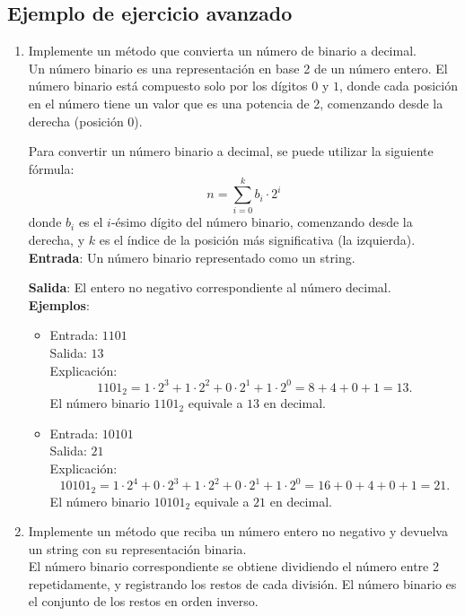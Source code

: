\documentclass{article}
\begin{document}
\subsection*{Ejemplo de ejercicio avanzado}

\begin{enumerate}[label=\alph*)]
    \item Implemente un método que convierta un número de binario a decimal.\\
    Un número binario es una representación en base 2 de un número entero. El número binario está compuesto solo por los dígitos \(0\) y \(1\), donde cada posición en el número tiene un valor que es una potencia de 2, comenzando desde la derecha (posición 0).

    Para convertir un número binario a decimal, se puede utilizar la siguiente fórmula:
    \[
    n = \sum_{i=0}^{k} b_i \cdot 2^i
    \]
    donde \(b_i\) es el \(i\)-ésimo dígito del número binario, comenzando desde la derecha, y \(k\) es el índice de la posición más significativa (la izquierda).\\

    \textbf{Entrada}: Un número binario representado como un string.

    \textbf{Salida}: El entero no negativo correspondiente al número decimal.\\

    \textbf{Ejemplos}:
    \begin{itemize}
        \item Entrada: \( \text{1101} \) \\
        Salida: \( 13 \) \\
        Explicación:
        \[
        1101_2 = 1 \cdot 2^3 + 1 \cdot 2^2 + 0 \cdot 2^1 + 1 \cdot 2^0 = 8 + 4 + 0 + 1 = 13.
        \]
        El número binario \(1101_2\) equivale a \(13\) en decimal.

        \item Entrada: \( \text{10101} \) \\
        Salida: \( 21 \) \\
        Explicación:
        \[
        10101_2 = 1 \cdot 2^4 + 0 \cdot 2^3 + 1 \cdot 2^2 + 0 \cdot 2^1 + 1 \cdot 2^0 = 16 + 0 + 4 + 0 + 1 = 21.
        \]
        El número binario \(10101_2\) equivale a \(21\) en decimal.
    \end{itemize}

    \item Implemente un método que reciba un número entero no negativo y devuelva un string con su representación binaria.\\
    El número binario correspondiente se obtiene dividiendo el número entre 2 repetidamente, y registrando los restos de cada división. El número binario es el conjunto de los restos en orden inverso.\\


\end{enumerate}
\end{document}
